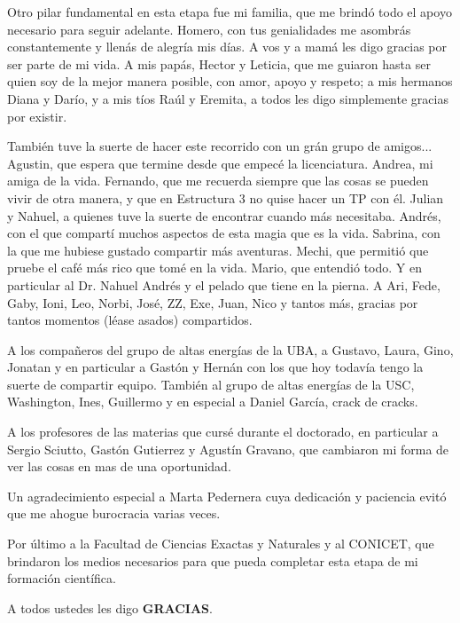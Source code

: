 Otro pilar fundamental en esta etapa fue mi familia, que me brind\'o todo el apoyo necesario para seguir adelante.
Homero, con tus genialidades me asombr\'as constantemente y llen\'as de alegr\'ia mis d\'ias. A vos y a mam\'a les digo gracias por ser parte de mi vida.
A mis pap\'as, Hector y Leticia, que me guiaron hasta ser quien soy de la mejor manera posible, con amor, apoyo y respeto; a mis hermanos Diana y Dar\'io, y a mis t\'ios Ra\'ul y Eremita, a todos les digo simplemente gracias por existir.

Tambi\'en tuve la suerte de hacer este recorrido con un gr\'an grupo de amigos...
Agustin, que espera que termine desde que empec\'e la licenciatura.
Andrea, mi amiga de la vida.
Fernando, que me recuerda siempre que las cosas se pueden vivir de otra manera, y que en Estructura 3 no quise hacer un TP con \'el.
Julian y Nahuel, a quienes tuve la suerte de encontrar cuando m\'as necesitaba.
Andr\'es, con el que compart\'i muchos aspectos de esta magia que es la vida.
Sabrina, con la que me hubiese gustado compartir m\'as aventuras.
Mechi, que permiti\'o que pruebe el caf\'e m\'as rico que tom\'e en la vida.
Mario, que entendi\'o todo.
Y en particular al Dr. Nahuel Andr\'es y el pelado que tiene en la pierna.
A Ari, Fede, Gaby, Ioni, Leo, Norbi, Jos\'e, ZZ, Exe, Juan, Nico y tantos m\'as, gracias por tantos momentos (l\'ease asados) compartidos.

A los compa\~neros del grupo de altas energ\'ias de la UBA, a Gustavo, Laura, Gino, Jonatan y en particular a Gast\'on y Hern\'an con los que hoy todav\'ia tengo la suerte de compartir equipo.
Tambi\'en al grupo de altas energ\'ias de la USC, Washington, Ines, Guillermo y en especial a Daniel Garc\'ia, crack de cracks.  

A los profesores de las materias que curs\'e durante el doctorado, en particular a Sergio Sciutto, Gast\'on Gutierrez y Agust\'in Gravano, que cambiaron mi forma de ver las cosas en mas de una oportunidad.

Un agradecimiento especial a Marta Pedernera cuya dedicaci\'on y paciencia evit\'o que me ahogue burocracia varias veces.

Por \'ultimo a la Facultad de Ciencias Exactas y Naturales y al CONICET, que brindaron los medios necesarios para que pueda completar esta etapa de mi formaci\'on cient\'ifica.

\vspace{1cm}
A todos ustedes les digo \textbf{GRACIAS}.